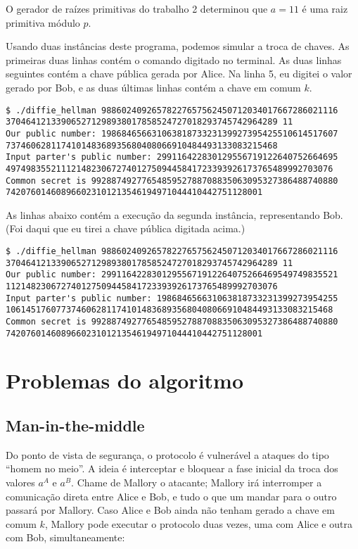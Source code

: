 \documentclass{article}
\begin{document}
O gerador de raízes primitivas do trabalho 2 determinou que
$a = 11$ é uma raiz primitiva módulo $p$.

Usando duas instâncias deste programa,
podemos simular a troca de chaves.
As primeiras duas linhas contém o comando digitado no terminal.
As duas linhas seguintes contém a chave pública gerada por Alice.
Na linha 5,
eu digitei o valor gerado por Bob,
e as duas últimas linhas contém a chave em comum $k$.

\begin{verbatim}
$ ./diffie_hellman 98860240926578227657562450712034017667286021116
370464121339065271298938017858524727018293745742964289 11
Our public number: 19868465663106381873323139927395425510614517607
737460628117410148368935680408066910484493133083215468
Input parter's public number: 299116422830129556719122640752664695
49749835521112148230672740127509445841723393926173765489992703076
Common secret is 9928874927765485952788708835063095327386488740880
742076014608966023101213546194971044410442751128001
\end{verbatim}

As linhas abaixo contém a execução da segunda instância,
representando Bob.
(Foi daqui que eu tirei a chave pública digitada acima.)

\begin{verbatim}
$ ./diffie_hellman 98860240926578227657562450712034017667286021116
370464121339065271298938017858524727018293745742964289 11
Our public number: 29911642283012955671912264075266469549749835521
112148230672740127509445841723393926173765489992703076
Input parter's public number: 198684656631063818733231399273954255
10614517607737460628117410148368935680408066910484493133083215468
Common secret is 9928874927765485952788708835063095327386488740880
742076014608966023101213546194971044410442751128001
\end{verbatim}

\section{Problemas do algoritmo}

\subsection{Man-in-the-middle}
Do ponto de vista de segurança,
o protocolo é vulnerável a ataques do tipo ``homem no meio''.
A ideia é interceptar e bloquear a fase inicial da troca dos valores $a^A$ e $a^B$.
Chame de Mallory o atacante;
Mallory irá interromper a comunicação direta entre Alice e Bob,
e tudo o que um mandar para o outro passará por Mallory.
Caso Alice e Bob ainda não tenham gerado a chave em comum $k$,
Mallory pode executar o protocolo duas vezes,
uma com Alice e outra com Bob, simultaneamente:
\end{document}
